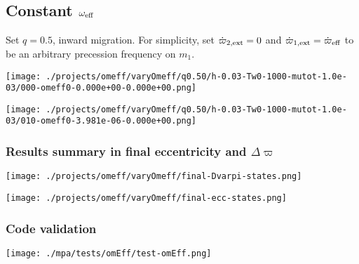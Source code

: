\documentclass[11pt]{article}
\begin{document}
\subsection{Constant \(\omega_{\rm eff}\)}
\label{sec:orgfcebcce}
Set \(q=0.5\), inward migration. For simplicity, set \(\dot\varpi_{2,\rm
ext} = 0\) and \(\dot\varpi_{1,\rm ext}=\dot\varpi_{\rm eff}\) to be an
arbitrary precession frequency on \(m_1\).

\begin{center}
\texttt{[image: ./projects/omeff/varyOmeff/q0.50/h-0.03-Tw0-1000-mutot-1.0e-03/000-omeff0-0.000e+00-0.000e+00.png]}
\end{center}

\begin{center}
\texttt{[image: ./projects/omeff/varyOmeff/q0.50/h-0.03-Tw0-1000-mutot-1.0e-03/010-omeff0-3.981e-06-0.000e+00.png]}
\end{center}

\subsubsection{Results summary in final eccentricity and \(\Delta\varpi\)}
\label{sec:orgec09f85}
\begin{center}
\texttt{[image: ./projects/omeff/varyOmeff/final-Dvarpi-states.png]}
\end{center}

\begin{center}
\texttt{[image: ./projects/omeff/varyOmeff/final-ecc-states.png]}
\end{center}

\subsubsection{Code validation}
\label{sec:org8c517f8}
\begin{center}
\texttt{[image: ./mpa/tests/omEff/test-omEff.png]}
\end{center}
\end{document}

